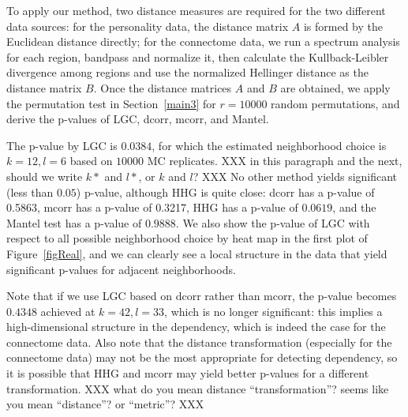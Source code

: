 \documentclass[11pt]{article}
\begin{document}
To apply our method, two distance measures are required for the two different data sources: for the personality data, the distance matrix $A$ is formed by the Euclidean distance directly; for the connectome data, we run a spectrum analysis for each region, bandpass and normalize it, then calculate the Kullback-Leibler divergence among regions and use the normalized Hellinger distance as the distance matrix $B$. Once the distance matrices $A$ and $B$ are obtained, we apply the permutation test in Section~\ref{main3} for $r=10000$ random permutations, and derive the p-values of LGC, dcorr, mcorr, and Mantel. 

The p-value by LGC is $0.0384$, for which the estimated neighborhood choice is $k=12, l=6$ based on $10000$ MC replicates. 
XXX in this paragraph and the next, should we write $k*$ and $l*$, or $k$ and $l$? XXX
No other method yields significant (less than $0.05$) p-value, although HHG is quite close: dcorr has a p-value of 0.5863, mcorr has a p-value of 0.3217, HHG has a p-value of $0.0619$, and the Mantel test has a p-value of $0.9888$. We also show the p-value of LGC with respect to all possible neighborhood choice by heat map in the first plot of Figure~\ref{figReal}, and we can clearly see a local structure in the data that yield significant p-values for adjacent neighborhoods.

Note that if we use LGC based on dcorr rather than mcorr, the p-value becomes $0.4348$ achieved at $k=42, l=33$, which is no longer significant: this implies a high-dimensional structure in the dependency, which is indeed the case for the connectome data. Also note that the distance transformation (especially for the connectome data) may not be the most appropriate for detecting dependency, so it is possible that HHG and mcorr may yield better p-values for a different transformation.  XXX what do you mean distance ``transformation''?  seems like you mean ``distance''? or ``metric''? XXX
\end{document}
